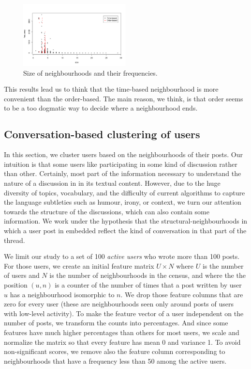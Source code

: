 \documentclass[conference]{IEEEtran}
\begin{document}
\begin{figure}
\centering
\includegraphics[width=0.5\textwidth]{census_size_vs_freq_gameofthrones}
\caption{Size of neighbourhoods and their frequencies.}
\label{fig:census_size_vs_freq}
\end{figure}


This results lead us to think that the time-based neighbourhood is more convenient than the order-based. The main reason, we think, is that order seems to be a too dogmatic way to decide where a neighbourhood ends.

\subsection{Conversation-based clustering of users}
In this section, we cluster users based on the neighbourhoods of their posts. Our intuition is that some users like participating in some kind of discussion rather than other. Certainly, most part of the information necessary to understand the nature of a discussion in in its textual content. However, due to the huge diversity of topics, vocabulary, and the difficulty of current algorithms to capture the language subtleties such as humour, irony, or context, we turn our attention towards the structure of the discussions, which can also contain some information. We work under the  hypothesis that the structural-neighbourhoods in which a user post in embedded reflect the kind of conversation in that part of the thread. 

We limit our study to a set of 100 \textit{active users} who wrote more than 100 posts. For those users, we create an initial feature matrix $U\times N$ where $U$ is the number of users and $N$ is the number of neighbourhoods in the census, and where the the position $(u,n)$ is a counter of the number of times that a post written by user $u$ has a neighbourhood isomorphic to $n$. We drop those feature columns that are zero for every user (these are neighbourhoods seen only around posts of users with low-level activity). To make the feature vector of a user independent on the number of posts, we transform the counts into percentages. And since some features have much higher percentages than others for most users, we scale and normalize the matrix so that every feature has mean 0 and variance 1. To avoid non-significant scores, we remove also the feature column corresponding to neighbourhoods that have a frequency less than 50 among the active users.
\end{document}
